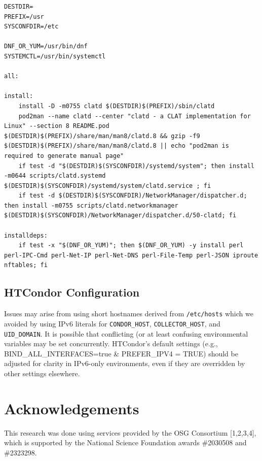 \documentclass[11pt]{article}
\begin{document}
\begin{lstlisting}[caption={Minimal Makefile for CLATD Installation}, label={lst:clatd-makefile}]
DESTDIR=
PREFIX=/usr
SYSCONFDIR=/etc

DNF_OR_YUM=/usr/bin/dnf
SYSTEMCTL=/usr/bin/systemctl

all:

install:
	install -D -m0755 clatd $(DESTDIR)$(PREFIX)/sbin/clatd
	pod2man --name clatd --center "clatd - a CLAT implementation for Linux" --section 8 README.pod $(DESTDIR)$(PREFIX)/share/man/man8/clatd.8 && gzip -f9 $(DESTDIR)$(PREFIX)/share/man/man8/clatd.8 || echo "pod2man is required to generate manual page"
	if test -d "$(DESTDIR)$(SYSCONFDIR)/systemd/system"; then install -m0644 scripts/clatd.systemd $(DESTDIR)$(SYSCONFDIR)/systemd/system/clatd.service ; fi
	if test -d $(DESTDIR)$(SYSCONFDIR)/NetworkManager/dispatcher.d; then install -m0755 scripts/clatd.networkmanager $(DESTDIR)$(SYSCONFDIR)/NetworkManager/dispatcher.d/50-clatd; fi

installdeps:
	if test -x "$(DNF_OR_YUM)"; then $(DNF_OR_YUM) -y install perl perl-IPC-Cmd perl-Net-IP perl-Net-DNS perl-File-Temp perl-JSON iproute nftables; fi
\end{lstlisting}


\subsection{HTCondor Configuration}
Issues may arise from using short hostnames derived from \texttt{/etc/hosts} which we avoided by using IPv6 literals for \texttt{CONDOR\_HOST}, \texttt{COLLECTOR\_HOST}, and \texttt{UID\_DOMAIN}.
It is possible that conflicting (or at least confusing environmental variables may be set concurrently. HTCondor’s default settings (e.g., BIND\_ALL\_INTERFACES=true \& PREFER\_IPV4 = TRUE) should be adjusted for clarity in IPv6-only environments, even if they are overridden by other settings elsewhere.

\section*{Acknowledgements}
This research was done using services provided by the OSG Consortium [1,2,3,4], which is supported by the National Science Foundation awards \#2030508 and \#2323298.
\end{document}
